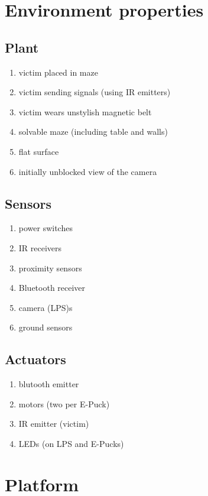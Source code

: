 \documentclass[a4paper,parskip,headheight=38pt]{scrartcl} %
\begin{document}
\section{Environment properties}

\subsection{Plant}
\begin{enumerate}[label=\plant]
\item victim placed in maze
\item victim sending signals (using IR emitters)
\item victim wears unstylish magnetic belt
\item solvable maze (including table and walls)
\item flat surface
\item initially unblocked view of the camera
\end{enumerate}

\subsection{Sensors}
\begin{enumerate}[label=\sensors]
\item power switches
\item IR receivers
\item proximity sensors
\item Bluetooth receiver
\item camera (LPS)s
\item ground sensors
\end{enumerate}

\subsection{Actuators}
\begin{enumerate}[label=\actuators]
\item blutooth emitter
\item motors (two per E-Puck)
\item IR emitter (victim)
\item LEDs (on LPS and E-Pucks)
\end{enumerate}


\section{Platform}
\end{document}
